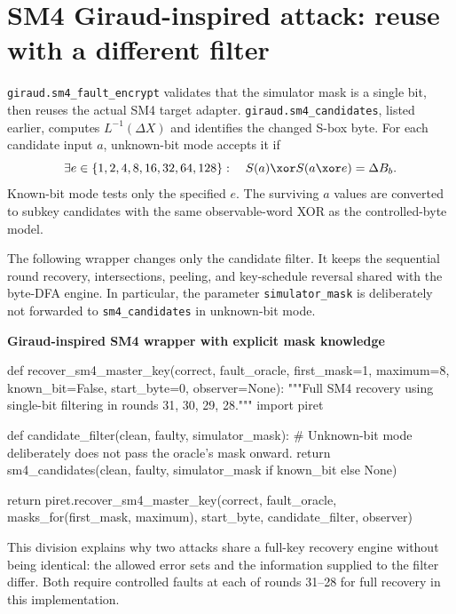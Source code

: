\section{SM4 Giraud-inspired attack: reuse with a different filter}
\texttt{giraud.sm4\_\allowbreak{}fault\_\allowbreak{}encrypt} validates that the simulator mask is a single bit, then reuses the actual SM4 target adapter. \texttt{giraud.sm4\_\allowbreak{}candidates}, listed earlier, computes $L^{-1}(\Delta X)$ and identifies the changed S-box byte. For each candidate input $a$, unknown-bit mode accepts it if
\[
\exists e\in\{1,2,4,8,16,32,64,128\}:\quad S(a)\xor S(a\xor e)=\Delta B_b.
\]
Known-bit mode tests only the specified $e$. The surviving $a$ values are converted to subkey candidates with the same observable-word XOR as the controlled-byte model.

The following wrapper changes only the candidate filter. It keeps the sequential round recovery, intersections, peeling, and key-schedule reversal shared with the byte-DFA engine. In particular, the parameter \texttt{simulator\_\allowbreak{}mask} is deliberately not forwarded to \texttt{sm4\_\allowbreak{}candidates} in unknown-bit mode.
\par\smallskip\noindent\textbf{Giraud-inspired SM4 wrapper with explicit mask knowledge}\par
\begin{lightcode}
def recover_sm4_master_key(correct, fault_oracle, first_mask=1, maximum=8, known_bit=False, start_byte=0, observer=None):
    """Full SM4 recovery using single-bit filtering in rounds 31, 30, 29, 28."""
    import piret

    def candidate_filter(clean, faulty, simulator_mask):
        # Unknown-bit mode deliberately does not pass the oracle's mask onward.
        return sm4_candidates(clean, faulty, simulator_mask if known_bit else None)

    return piret.recover_sm4_master_key(correct, fault_oracle, masks_for(first_mask, maximum), start_byte, candidate_filter, observer)
\end{lightcode}

This division explains why two attacks share a full-key recovery engine without being identical: the allowed error sets and the information supplied to the filter differ. Both require controlled faults at each of rounds 31--28 for full recovery in this implementation.

